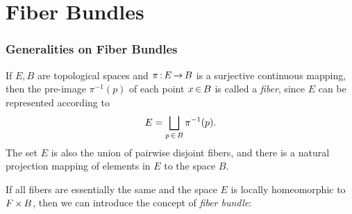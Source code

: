 \documentclass[11pt,twoside]{article}
\begin{document}

\newpage
\thispagestyle{empty}
\part{Fiber Bundles}                                                           %

\section{Generalities on Fiber Bundles}
If $E,B$ are topological spaces and $\pi {\,:\,} E {\,\to\,} B$ is a surjective
continuous mapping,
then the pre-image $\pi^{-1}(p)$ of each point $x {\,\in\,} B$ is called
 a \textit{fiber},
since $E$ can be represented according to
\[
E = \bigsqcup_{p {\,\in\,} B} \pi^{-1}(p).
\]
The set $E$ is also the union of pairwise disjoint fibers,
and there is a natural projection mapping of elements in $E$ to the space $B$.

\subparagraph{}
If all fibers are essentially the same
and the space $E$ is locally homeomorphic to $F {\,\times\,} B$,
then we can introduce the concept of \textit{fiber bundle}:
\end{document}
